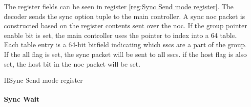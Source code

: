 The register fields can be seen in register \ref{reg:Sync Send mode register}.
The decoder sends the sync option tuple to the main controller.
A sync \ac{noc} packet is constructed based on the register contents sent over the \ac{noc}.
If the group pointer enable bit is set, the main controller uses the pointer to index into a 64 table. 
Each table entry is a 64-bit bitfield indicating which \acp{ssc} are a part of the group.
If the all flag is set, the sync packet will be sent to all \acp{ssc}.
if the host flag is also set, the host bit in the \ac{noc} packet will be set.
\begin{register}{H}{Sync Send mode register}{}%
  \label{reg:Sync Send mode register}
  \vspace{-20pt}
\end{register}

\paragraph{Sync Wait}

